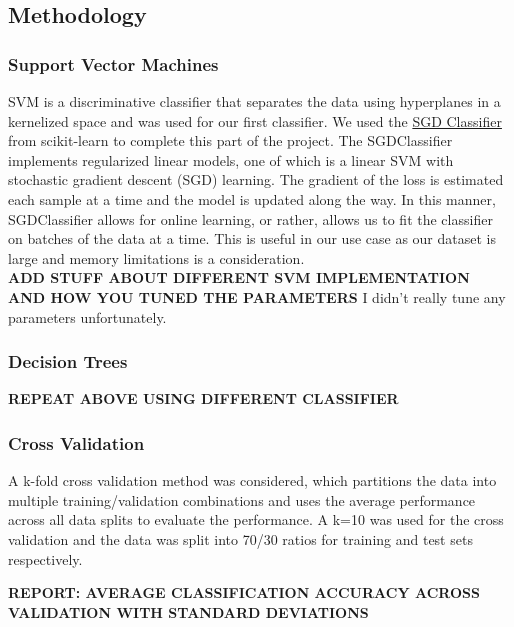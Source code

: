 \documentclass[12pt]{article}
\begin{document}
\subsection{Methodology}

\subsubsection{Support Vector Machines}

SVM is a discriminative classifier that separates the data using hyperplanes in a kernelized space and was used for our first classifier. We used the \href{https://scikit-learn.org/stable/modules/generated/sklearn.linear_model.SGDClassifier.html}{SGD Classifier} from scikit-learn \cite{sklearn} to complete this part of the project. The SGDClassifier implements regularized linear models, one of which is a linear SVM with stochastic gradient descent (SGD) learning. The gradient of the loss is estimated each sample at a time and the model is updated along the way. In this manner, SGDClassifier allows for online learning, or rather, allows us to fit the classifier on batches of the data at a time. This is useful in our use case as our dataset is large and memory limitations is a consideration. \\

\textbf{ADD STUFF ABOUT DIFFERENT SVM IMPLEMENTATION AND HOW YOU TUNED THE PARAMETERS}
I didn't really tune any parameters unfortunately.


\subsubsection{Decision Trees}

\textbf{REPEAT ABOVE USING DIFFERENT CLASSIFIER}

\subsubsection{Cross Validation}

A k-fold cross validation method was considered, which partitions the data into multiple training/validation combinations and uses the average performance across all data splits to evaluate the performance. A k=10 was used for the cross validation and the data was split into 70/30 ratios for training and test sets respectively.

\textbf{REPORT: AVERAGE CLASSIFICATION ACCURACY ACROSS VALIDATION WITH STANDARD DEVIATIONS} \\
\end{document}
